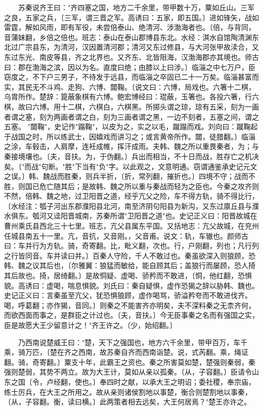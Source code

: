 　　苏秦说齐王曰："齐四塞之国，地方二千余里，带甲数十万，粟如丘山。三军之良，五家之兵，〔三军，谓三晋之军。高诱曰：五家，即五国。〕进如锋矢，战如雷霆，解如风雨，即有军役，未尝倍泰山、绝清河、涉渤海者也。〔倍，与背同，音蒲妹翻，乡倍之倍也。班志：泰山在泰山郡博县东北。水经：淇水自馆陶清渊东北过广宗县东，为清河，汉因置清河郡；清河又东过修县，与大河张甲故渎合，又东过东光、南皮等县，齐之北界也。又齐东、北皆阻海，汉渤海郡亦其境也。师古曰：郡在渤海之滨，因以为名。直度曰绝；由膝以上曰涉。〕临淄之中七万户，臣窃度之，不下户三男子，不待发于远县，而临淄之卒固已二十一万矣。临淄甚富而实，其民无不斗鸡、走狗、六博、闒鞠。〔说文曰：六博，局戏也。六箸十二棋，乌胄所作。楚辞：箟蔽象棋有六博。鲍宏博经曰：琨蔽，玉箸也。各投六箸，行六棋，故曰六博。用十二棋，六棋白，六棋黑。所掷头谓之琼，琼有五采，刻为一画者谓之塞，刻为两画者谓之白，刻为三画者谓之黑，一边不刻者，五塞之间，谓之五塞。 "闒鞠"，史记作"蹋鞠"，以皮为之，实之以毛，蹴蹋而戏。刘向曰：蹴鞠起于战国之时，所以练武士，因嬉戏而讲习之；或言黄帝所作。闒，徒腊翻。〕临淄之涂，车毂击，人肩摩，连衽成帷，挥汗成雨。夫韩、魏之所以重畏秦者，为；与秦接境壤也。〔夫，音扶。为，于伪翻。〕兵出而相当，不十日而战，胜存亡之机决矣。〔"而战"句断。"胜"下当有"负"字。以此观之，文意明通。窃谓通鉴承史记元文之误。〕韩、魏战而胜秦，则兵半折，〔折，常列翻，摧折也。〕四境不守；战而不胜，则国已危亡随其后；是故韩、魏之所以重与秦战而轻为之臣也。今秦之攻齐则不然，倍韩、魏之地，过卫阳晋之道，经乎亢父之险，车不得方轨，骑不得比行，〔水经注：瓠子河出东郡濮阳县北河，南至济阴句阳县为新沟，又东过廪丘县与濮水俱东。瓠河又迳阳晋城南，苏秦所谓"卫阳晋之道"也。史记正义曰：阳晋故城在曹州乘氏县西北三十七里。班志，亢父县属东平国。又括地志：亢父故城，在兖州任城县南五十一里。亢，音抗，又音刚。，父音甫。说文：轨，车辙也。颜师古曰：车并行为方轨。骑，奇寄翻。比，毗义翻，次也。行，户刚翻，列也；凡行列之行皆同音。车并读曰并。〕百秦人守险，千人不敢过也。秦虽欲深入则狼顾，恐韩、魏之议其后也，〔尔雅翼：狼猛而敏给，能自顾其后；盖狼行而屡顾，恐人掎其后故也。掎，居绮翻。〕是故恫疑、虚喝、骄矜而不敢进，〔恫，他红翻，恐惧貌。高诱曰：虚喝，喘息惧貌。刘氏曰：秦自疑惧，虚作恐猲之辞以胁韩、魏也。史记正义曰：言秦虽至亢父，犹恐惧狼顾，虚作喝骂，骄溢矜夸而不敢进伐齐。喝，呼葛翻；亦作猲，音同。〕则秦之不能害齐亦明矣，夫不深料秦之无柰齐何，而欲西面而事之，是群臣之计过也。〔夫，音扶。〕今无臣事秦之名而有强国之实，臣是故愿大王少留意计之！"齐王许之。〔少，始绍翻。〕

　　乃西南说楚威王曰："楚，天下之强国也，地方六千余里，带甲百万，车千乘，骑万匹，〔楚在齐之西南，故苏秦自齐而西南诣楚。说，式芮翻。乘，绳证翻。骑，奇寄翻。〕粟支十年，此霸王之资也。秦之所害莫如楚，楚强则秦弱，秦强则楚弱，其势不两立。故为大王计，莫如从亲以孤秦。〔从，子容翻。〕臣请令山东之国〔令，卢经翻，使也。〕奉四时之献，以承大王之明诏；委社稷，奉宗庙，练士厉兵，在大王之所用之。故从亲则诸侯割地以事楚，衡合则楚割地以事秦，〔从，子容翻。衡，读曰横。〕此两策者相去远矣，大王何居焉？"楚王亦许之。

